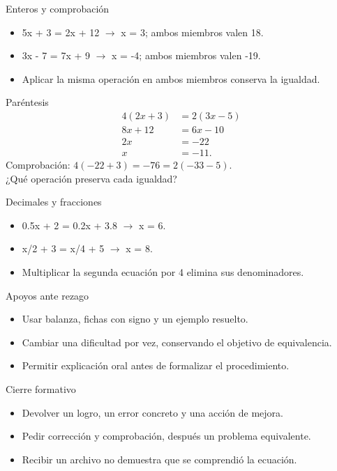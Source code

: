 \documentclass[
	spanish,
	aspectratio=1610,
	xcolor={dvipsnames,table}
]{beamer}
\begin{document}
\begin{frame}{Enteros y comprobación}
\fontsize{14}{18}\selectfont\begin{itemize}\setlength{\itemsep}{.45cm}
\item 5x + 3 = 2x + 12 $\rightarrow$ x = 3; ambos miembros valen 18.
\item 3x - 7 = 7x + 9 $\rightarrow$ x = -4; ambos miembros valen -19.
\item Aplicar la misma operación en ambos miembros conserva la igualdad.
\end{itemize}
\end{frame}
\begin{frame}{Paréntesis}
\fontsize{14}{18}\selectfont\begin{align*}4(2x+3)&=2(3x-5)\\8x+12&=6x-10\\2x&=-22\\x&=-11.\end{align*}
\centering Comprobación: $4(-22+3)=-76=2(-33-5)$.\\[.15cm]¿Qué operación preserva cada igualdad?
\end{frame}
\begin{frame}{Decimales y fracciones}
\fontsize{14}{18}\selectfont\begin{itemize}\setlength{\itemsep}{.45cm}
\item 0.5x + 2 = 0.2x + 3.8 $\rightarrow$ x = 6.
\item x/2 + 3 = x/4 + 5 $\rightarrow$ x = 8.
\item Multiplicar la segunda ecuación por 4 elimina sus denominadores.
\end{itemize}
\end{frame}
\begin{frame}{Apoyos ante rezago}
\fontsize{14}{18}\selectfont\begin{itemize}\setlength{\itemsep}{.45cm}
\item Usar balanza, fichas con signo y un ejemplo resuelto.
\item Cambiar una dificultad por vez, conservando el objetivo de equivalencia.
\item Permitir explicación oral antes de formalizar el procedimiento.
\end{itemize}
\end{frame}
\begin{frame}{Cierre formativo}
\fontsize{14}{18}\selectfont\begin{itemize}\setlength{\itemsep}{.45cm}
\item Devolver un logro, un error concreto y una acción de mejora.
\item Pedir corrección y comprobación, después un problema equivalente.
\item Recibir un archivo no demuestra que se comprendió la ecuación.
\end{itemize}
\end{frame}
\end{document}
